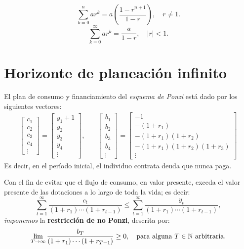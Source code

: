 \documentclass[8pt,a4paper]{extarticle}
\begin{document}
\begin{multicols}{3}
	\begin{boxrmk}
		\[\sum_{k=0}^n ar^k = a \left( \frac{1 - r^{n + 1}}{1 - r} \right), \quad r \neq 1.\]
		\[\sum_{k = 0}^{\infty} ar^k = \frac{a}{1 - r}, \quad \lvert r \rvert < 1.\]
	\end{boxrmk}

	\newpage

	\section{Horizonte de planeación infinito}

	\begin{boxrmk}
		El plan de consumo y financiamiento del \emph{esquema de Ponzi} está dado por los siguientes vectores:
		\begin{align*}
			\begin{bmatrix}
				c_1 \\
				c_2 \\
				c_3 \\
				c_4 \\
				\vdots
			\end{bmatrix}
			=
			\begin{bmatrix}
				y_1 + 1 \\
				y_2     \\
				y_3     \\
				y_4     \\
				\vdots
			\end{bmatrix}, \quad &
			\begin{bmatrix}
				b_1 \\
				b_2 \\
				b_3 \\
				b_4 \\
				\vdots
			\end{bmatrix}
			=
			\begin{bmatrix}
				-1                           \\
				-(1 + r_1)                   \\
				-(1 + r_1)(1 + r_2)          \\
				-(1 + r_1)(1 + r_2)(1 + r_3) \\
				\vdots
			\end{bmatrix}
		\end{align*}
		Es decir, en el período inicial, el individuo contrata deuda que nunca paga.
	\end{boxrmk}

	\begin{boxtheo}
		Con el fin de evitar que el flujo de consumo, en valor presente, exceda el valor presente de las dotaciones a lo largo de toda la vida; es decir:
		\[\sum_{t = 1}^{\infty} \frac{c_t}{(1 + r_1)\cdots(1 + r_{t -1})} \leq \sum_{t = 1}^{\infty} \frac{y_t}{(1 + r_1)\cdots(1 + r_{t -1})},\]
		\emph{imponemos} la \textbf{restricción de no Ponzi}, descrita por:
		\[\lim_{T \to \infty} \frac{b_T}{(1 + r_1)\cdots(1 + r_{T -1})} \geq 0, \quad \textnormal{para alguna } T \in \mathbb{N} \textnormal{ arbitraria}.\]
	\end{boxtheo}


\end{multicols}
\end{document}
